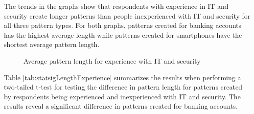     The trends in the graphs show that respondents with experience in IT and security create longer patterns than people inexperienced with IT and security for all three pattern types. For both graphs, patterns created for banking accounts has the highest average length while patterns created for smartphones have the shortest average pattern length. 

      \begin{figure}[H]
        \centering
        \caption{Average pattern length for experience with IT and security}
        \label{fig:avgpatternlengthexperience}
      \end{figure}

    Table \ref{tab:statsigLengthExperience} summarizes the results when performing a two-tailed t-test for testing the difference in pattern length for patterns created by respondents being experienced and inexperienced with IT and security. The results reveal a significant difference in patterns created for banking accounts. 

